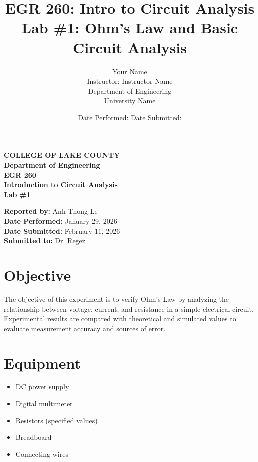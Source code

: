 \documentclass[12pt]{article}
\begin{document}
\begin{titlepage}
    \centering

    \vspace*{1in}

    \textbf{\Large COLLEGE OF LAKE COUNTY} \\[0.2in]

    \textbf{\large Department of Engineering} \\[0.6in]

    \textbf{\Large EGR 260} \\
    \textbf{\large Introduction to Circuit Analysis} \\[0.6in]

    \textbf{\Large Lab \#1} \\[0.2in]


    \begin{center}
            \textbf{Reported by:} Anh Thong Le \\[0.15in]
    \textbf{Date Performed:} January 29, 2026 \\[0.15in]
    \textbf{Date Submitted:} February 11, 2026 \\[0.15in]
    \textbf{Submitted to:} Dr. Regez
    \end{center}
        

    \vfill
\end{titlepage}


\title{\textbf{EGR 260: Intro to Circuit Analysis}\\
Lab \#1: Ohm's Law and Basic Circuit Analysis}
\author{
Your Name \\
Instructor: Instructor Name \\
Department of Engineering \\
University Name
}
\date{Date Performed: \quad Date Submitted:}

\section{Objective}
The objective of this experiment is to verify Ohm’s Law by analyzing the relationship between voltage, current, and resistance in a simple electrical circuit. Experimental results are compared with theoretical and simulated values to evaluate measurement accuracy and sources of error.

\section{Equipment}
\begin{itemize}
    \item DC power supply
    \item Digital multimeter
    \item Resistors (specified values)
    \item Breadboard
    \item Connecting wires
\end{itemize}
\end{document}
